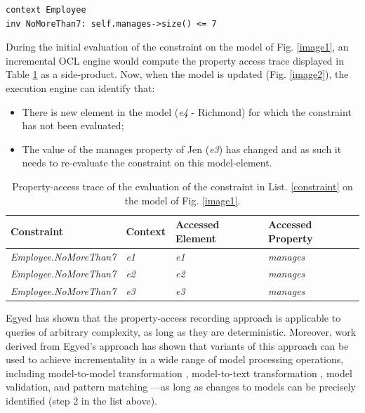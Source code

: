 \documentclass{llncs}
\begin{document}
\begin{lstlisting}[style=ocl,caption={OCL constraint requiring that no employee directly manages more than 7 other employees.},label=constraint]
context Employee
inv NoMoreThan7: self.manages->size() <= 7
\end{lstlisting}

During the initial evaluation of the constraint on the model of Fig. \ref{image1}, an incremental OCL engine would compute the property access trace displayed in Table \ref{table1} as a side-product. Now, when the model is updated (Fig. \ref{image2}), the execution engine can identify that:

\begin{itemize}
\item There is new element in the model (\emph{e4} - Richmond) for which the constraint has not been evaluated;
\item The value of the manages property of Jen (\emph{e3}) has changed and as such it needs to re-evaluate
the constraint on this model-element.
\end{itemize}

\begin{table}[h!]
\centering
\caption{Property-access trace of the evaluation of the constraint in List. \ref{constraint} on the model of Fig. \ref{image1}.}
\begin{tabular}{p{4.8cm} p{2.1cm} p{2cm} p{2.1cm}}
\hline 
\rule[-1ex]{0pt}{2.5ex}\textbf{Constraint} & \textbf{Context} & \textbf{Accessed Element} & \textbf{Accessed Property} \\ 
\hline 
\emph{Employee.NoMoreThan7}  & \emph{e1} & \emph{e1} & \emph{manages} \\ 
\emph{Employee.NoMoreThan7}  & \emph{e2} & \emph{e2} & \emph{manages} \\ 
\emph{Employee.NoMoreThan7}  & \emph{e3} & \emph{e3} & \emph{manages} \\ 
\hline 
\end{tabular} 
\label{table1}
\end{table}

Egyed has shown that the property-access recording approach is applicable to queries of arbitrary complexity, as long as they are deterministic. Moreover, work derived from Egyed’s approach has shown that variants of this approach can be used to achieve incrementality in a wide range of model processing operations, including model-to-model transformation \cite{jouault2010towards}, model-to-text transformation \cite{ogunyomi2015property}, model validation, and pattern matching \cite{rath2012derived}---as long as changes to models can be precisely identified (step 2 in the list above).
\end{document}
